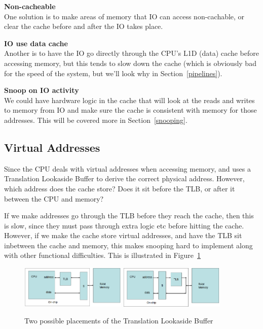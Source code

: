 \begin{description}
  \item \textbf{Non-cacheable}\\
    One solution is to make areas of memory that IO can access non-cachable, or
    clear the cache before and after the IO takes place.
  \item \textbf{IO use data cache}\\
    Another is to have the IO go directly through the CPU's L1D (data) cache
    before accessing memory, but this tends to slow down the cache (which is
    obviously bad for the speed of the system, but we'll look why in
    Section~\ref{pipelines}).
  \item \textbf{Snoop on IO activity}\\
    We could have hardware logic in the cache that will look at the reads and
    writes to memory from IO and make sure the cache is consistent with memory
    for those addresses. This will be covered more in Section~\ref{snooping}.
\end{description}

\subsection{Virtual Addresses}

Since the CPU deals with virtual addresses when accessing memory, and uses a
Translation Lookaside Buffer to derive the correct physical address. However,
which address does the cache store? Does it sit before the TLB, or after it
between the CPU and memory?

If we make addresses go through the TLB before they reach the cache, then this
is slow, since they must pass through extra logic etc before hitting the cache.
However, if we make the cache store virtual addresses, and have the TLB sit
inbetween the cache and memory, this makes snooping hard to implement along with
other functional difficulties. This is illustrated in Figure~\ref{tlb-pos}

\begin{figure}[h]
  \centering
  \includegraphics[width=0.45\textwidth]{images/tlb-pos-before}
  \includegraphics[width=0.45\textwidth]{images/tlb-pos-after}
  \caption{Two possible placements of the Translation Lookaside Buffer}
  \label{tlb-pos}
\end{figure}

